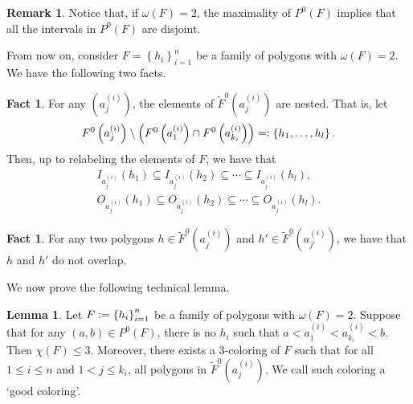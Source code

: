 \documentclass[12pt]{article}
\theoremstyle{definition}
\newtheorem{lemma}[thm]{Lemma}
\newtheorem{rmk}[thm]{Remark}
\newtheorem{fact}[thm]{Fact}
\newcommand{\defeq}{\vcentcolon=}
\newcommand{\eqdef}{=\vcentcolon}
\begin{document}
     \begin{rmk}
         Notice that, if 
         $\omega\left(F\right) = 2$,
         the maximality of
         $P^{0}\left(F\right)$ 
         implies that all the
         intervals in $P^{0}\left(F\right)$
         are disjoint.
     \end{rmk}

     From now on, consider
     $F = \left\{h_{i}\right\}_{i = 1}^{n}$ 
     be a family of polygons
     with $\omega\left(F\right)=2$.
     We have the following two facts.

     \begin{fact}
         For any $\left(a_{j}^{\left(i\right)}\right)$,
         the elements of
         $\widetilde{F}^{0}\left(a_{j}^{\left(i\right)}\right)$ 
         are nested. That is, let
         \begin{gather*}
             F^{0}\left(a_{j}^{\left(i\right)}\right) \setminus 
             \left(F^{0}\left(a_{1}^{\left(i\right)}\right) \cap 
             F^{0}\left(a_{k_{i}}^{\left(i\right)}\right)\right)
             \eqdef \left\{h_1, \ldots, h_{l}\right\}.
         \end{gather*}
         Then, up to relabeling
         the elements of $F$, we have that
         \begin{gather*}
             I_{a_{j}^{\left(i\right)}}\left(h_1\right)
             \subseteq I_{a_{j}^{\left(i\right)}}\left(h_2\right)
             \subseteq \cdots
             \subseteq I_{a_{j}^{\left(i\right)}}\left(h_{l}\right), \\
             O_{a_{j}^{\left(i\right)}}\left(h_1\right)
             \subseteq O_{a_{j}^{\left(i\right)}}\left(h_2\right)
             \subseteq \cdots
             \subseteq O_{a_{j}^{\left(i\right)}}\left(h_{l}\right).
         \end{gather*}
     \end{fact}
     
     \begin{fact}
         For any two polygons
         $h \in \widetilde{F}^{0}\left(a_{j}^{\left(i\right)}\right)$ 
         and 
         $h' \in \widetilde{F}^{0}\left(a_{j'}^{\left(i\right)}\right)$, 
         we have that $h$ and $h'$
         do not overlap.    
     \end{fact}

     We now prove the following
     technical lemma.

     \begin{lemma} \label{lemma:poly}
         Let $F \defeq \left\{h_{i}\right\}_{i =1}^{n}$ 
         be a family of polygons with
         $\omega\left(F\right) = 2$.
         Suppose that for any
         $\left(a, b\right) \in P^{0}\left(F\right)$,
         there is no $h_{i}$ such
         that $a < a_1^{\left(i\right)}
         < a_{k_{i}}^{\left(i\right)} < b$.
         Then $\chi\left(F\right) \leq 3$.
         Moreover, there exists
         a 3-coloring of $F$ such
         that for all $1 \leq i \leq n$
         and $1 < j \leq k_{i}$,
         all polygons in
         $\widetilde{F}^{0}\left(a_{j}^{\left(i\right)}\right)$.
         We call such coloring a
         `good coloring'.
     \end{lemma}
\end{document}
